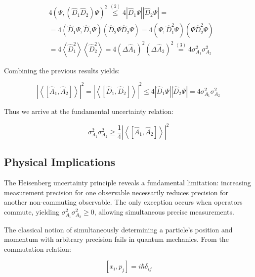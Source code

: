 \documentclass[italian]{HKNdocument}
\begin{document}
\begin{align}
& 4\left(\Psi,\left(\hat{D}_{1} \hat{D}_{2}\right) \Psi\right)^{2} \stackrel{(2)}{\leq} 4\left|\hat{D}_{1} \Psi\right|\left|\hat{D}_{2} \Psi\right|= \\
& =4\left(\hat{D}_{1} \Psi, \hat{D}_{1} \Psi\right)\left(\hat{D}_{2} \Psi \hat{D}_{2} \Psi\right)=4\left(\Psi, \hat{D}_{1}^{2} \Psi\right)\left(\Psi \hat{D}_{2}^{2} \Psi\right)  \label{eq:7.15}\\
& =4\left\langle\hat{D}_{1}^{2}\right\rangle\left\langle\hat{D}_{2}^{2}\right\rangle=4\left(\Delta \hat{A}_{1}\right)^{2}\left(\Delta \hat{A}_{2}\right)^{2} \stackrel{(3)}{=} 4 \sigma_{A_{1}}^{2} \sigma_{A_{2}}^{2}
\end{align}

Combining the previous results yields:

\begin{equation}
\left|\left\langle\left[\hat{A}_{1}, \hat{A}_{2}\right]\right\rangle\right|^{2}=\left|\left\langle\left[\hat{D}_{1}, \hat{D}_{2}\right]\right\rangle\right|^{2} \leq 4\left|\hat{D}_{1} \Psi\right|\left|\hat{D}_{2} \Psi\right|=4 \sigma_{A_{1}}^{2} \sigma_{A_{2}}^{2} \label{eq:7.16}
\end{equation}

Thus we arrive at the fundamental uncertainty relation:

\begin{equation}
\sigma_{A_{1}}^{2} \sigma_{A_{2}}^{2} \geq \frac{1}{4}\left|\left\langle\left[\hat{A}_{1}, \hat{A}_{2}\right]\right\rangle\right|^{2} \label{eq:7.17}
\end{equation}

\subsection{Physical Implications}
The Heisenberg uncertainty principle reveals a fundamental limitation: increasing measurement precision for one observable necessarily reduces precision for another non-commuting observable. The only exception occurs when operators commute, yielding $\sigma_{A_{1}}^{2} \sigma_{A_{2}}^{2} \geq 0$, allowing simultaneous precise measurements.

The classical notion of simultaneously determining a particle's position and momentum with arbitrary precision fails in quantum mechanics. From the commutation relation:

\begin{equation}
\left[x_{i}, p_{j}\right]=i \hbar \delta_{i j} \label{eq:7.18}
\end{equation}
\end{document}
